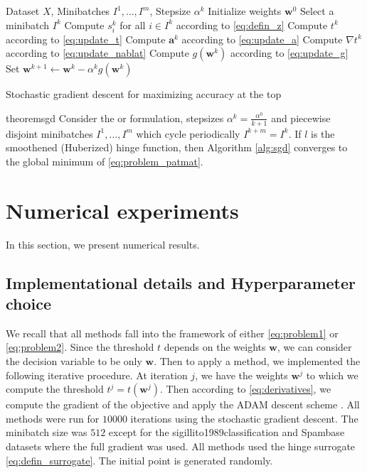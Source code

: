 \begin{algorithm}[!ht]
  \begin{algorithmic}[1]
    \Require Dataset $X$, Minibatches $I^1,\dots,I^m$, Stepsize $\alpha^k$
    \State Initialize weights $\bm{w}^0$
    \State Select a minibatch $I^k$
    \State Compute $s_i^k$ for all $i\in I^k$ according to \eqref{eq:defin_z}
    \State Compute $t^k$ according to \eqref{eq:update_t}
    \State Compute $\bm{a}^k$ according to \eqref{eq:update_a}
    \State Compute $\nabla t^k$ according to \eqref{eq:update_nablat}
    \State Compute $g(\bm{w}^k)$ according to \eqref{eq:update_g}
    \State Set $\bm{w}^{k+1}\gets \bm{w}^k - \alpha^k g(\bm{w}^k)$
    \EndFor
  \end{algorithmic}
  \caption{Stochastic gradient descent for maximizing accuracy at the top}
  \label{alg:sgd}
\end{algorithm}

\begin{restatable}{theorem}{sgd}\label{thm:sgd}
  Consider the \PatMat or \PatMatNP formulation, stepsizes $\alpha^k = \frac{\alpha^0}{k+1}$ and piecewise disjoint minibatches $I^1,\dots,I^m$ which cycle periodically $I^{k+m}=I^k$. If $l$ is the smoothened (Huberized) hinge function, then Algorithm \ref{alg:sgd} converges to the global minimum of \eqref{eq:problem_patmat}.  
\end{restatable}

\section{Numerical experiments}\label{sec:num1}

In this section, we present numerical results.

\subsection{Implementational details and Hyperparameter choice}

We recall that all methods fall into the framework of either \eqref{eq:problem1} or \eqref{eq:problem2}. Since the threshold $t$ depends on the weights $\bm{w}$, we can consider the decision variable to be only $\bm{w}$. Then to apply a method, we implemented the following iterative procedure. At iteration $j$, we have the weights $\bm{w}^j$ to which we compute the threshold $t^j=t(\bm{w}^j)$. Then according to \eqref{eq:derivatives}, we compute the gradient of the objective and apply the ADAM descent scheme \cite{kingma2014adam}. All methods were run for $10000$ iterations using the stochastic gradient descent. The minibatch size was $512$ except for the sigillito1989classification and Spambase datasets where the full gradient was used. All methods used the hinge surrogate \eqref{eq:defin_surrogate}. The initial point is generated randomly.

